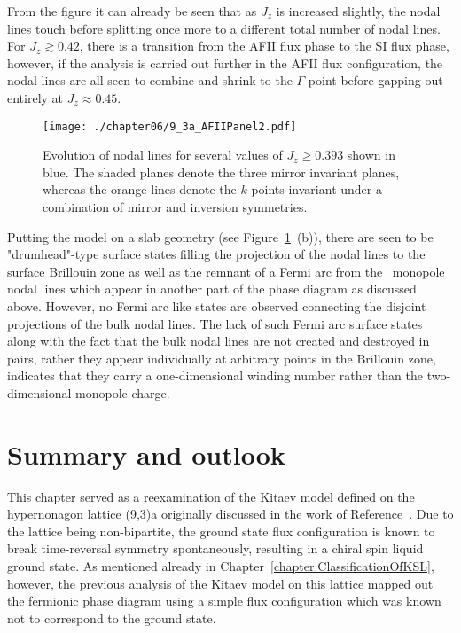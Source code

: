 From the figure it can already be seen that as $J_z$ is increased slightly, the nodal lines touch before splitting once more to a different total number of nodal lines.
For $J_z \gtrsim 0.42$, there is a transition from the AFII flux phase to the SI flux phase, however, if the analysis is carried out further in the AFII flux configuration, the nodal lines are all seen to combine and shrink to the $\Gamma$-point before gapping out entirely at $J_z \approx 0.45$.
%
\begin{figure}[tb]
	\centering
	\texttt{[image: ./chapter06/9\_3a\_AFIIPanel2.pdf]}
	\caption{
		Evolution of nodal lines for several values of $J_z \geq 0.393$ shown in blue.
		The shaded planes denote the three mirror invariant planes, whereas the orange lines denote the $k$-points invariant under a combination of mirror and inversion symmetries.
	}
	\label{fig:chapter06_AFIIPanel2}
\end{figure}
%

Putting the model on a slab geometry (see Figure~\ref{fig:chapter06_AFIIPanel2}~(b)), there are seen to be "drumhead"-type surface states filling the projection of the nodal lines to the surface Brillouin zone as well as the remnant of a Fermi arc from the \ZZ~monopole nodal lines which appear in another part of the phase diagram as discussed above.
However, no Fermi arc like states are observed connecting the disjoint projections of the bulk nodal lines.
The lack of such Fermi arc surface states along with the fact that the bulk nodal lines are not created and destroyed in pairs, rather they appear individually at arbitrary points in the Brillouin zone, indicates that they carry a one-dimensional winding number rather than the two-dimensional monopole charge.


%
%
\section{Summary and outlook}
\label{section:chapter06_Conclusion}
%
%
This chapter served as a reexamination of the Kitaev model defined on the hypernonagon lattice (9,3)a originally discussed in the work of Reference~\cite{OBrienPRB2016}.
Due to the lattice being non-bipartite, the ground state flux configuration is known to break time-reversal symmetry spontaneously, resulting in a chiral spin liquid ground state.
As mentioned already in Chapter~\ref{chapter:ClassificationOfKSL}, however, the previous analysis of the Kitaev model on this lattice mapped out the fermionic phase diagram using a simple flux configuration which was known not to correspond to the ground state.

